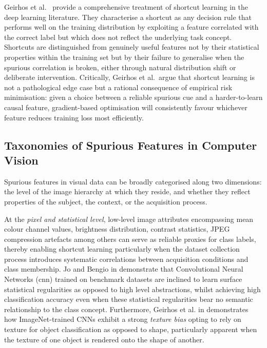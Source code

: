 Geirhos et al.~\cite{Geirhos_2020_ShortcutLearningInDeepNeuralNetworks} provide a
comprehensive treatment of shortcut learning in the deep learning literature. They
characterise a shortcut as any decision rule that performs well on the training distribution
by exploiting a feature correlated with the correct label but which does not reflect the
underlying task concept. Shortcuts are distinguished from genuinely useful features not by
their statistical properties within the training set but by their failure to generalise when
the spurious correlation is broken, either through natural distribution shift or deliberate
intervention. Critically, Geirhos et al.\ argue that shortcut learning is not a pathological
edge case but a rational consequence of empirical risk minimisation: given a choice between a
reliable spurious cue and a harder-to-learn causal feature, gradient-based optimisation will
consistently favour whichever feature reduces training loss most efficiently.

\subsection*{Taxonomies of Spurious Features in Computer Vision}

Spurious features in visual data can be broadly categorised along two dimensions: the level
of the image hierarchy at which they reside, and whether they reflect properties of the
subject, the context, or the acquisition process.

At the \emph{pixel and statistical level}, low-level image attributes encompassing mean colour channel values, brightness distribution, contrast statistics, JPEG compression artefacts among others can serve as reliable proxies for class labels, thereby enabling shortcut learning particularly when the dataset collection process introduces systematic correlations between acquisition conditions and class membership. Jo and Bengio  in \cite{Jo_2017_SurfaceStatisticalRegularities} demonstrate that Convolutional Neural Networks (\acrshort{cnn}) trained on benchmark datasets are inclined to learn surface statistical regularities as opposed to high level abstractions, whilst achieving high classification accuracy even when these statistical regularities bear no semantic relationship to the class concept. Furthermore, Geirhos et al. in \cite{Geirhos_2019_TextureBias} demonstrates how ImageNet-trained CNNs exhibit a strong \emph{texture bias} opting to rely on texture for object classification as opposed to shape, particularly apparent when the texture of one object is rendered onto the shape of another.

